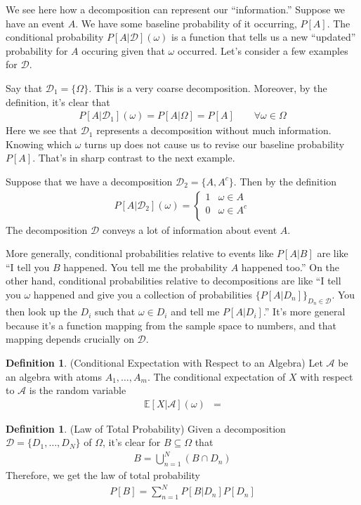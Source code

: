 \documentclass[12pt]{article}
\theoremstyle{plain}
\theoremstyle{definition}
\newtheorem{defn}[thm]{Definition}
\theoremstyle{remark}
\newcommand{\sD}{\mathscr{D}}
\newcommand{\sA}{\mathscr{A}}
\newcommand{\E}{\mathbb{E}}
\newcommand{\sumnN}{\sum^N_{n=1}}
\newcommand{\nN}{_{n=1}^N}
\begin{document}
We see here how a decomposition can represent our ``information.''
Suppose we have an event $A$. We have some baseline probability of it
occurring, $P[A]$. The conditional probability $P[A|\sD](\omega)$ is a
function that tells us a new ``updated'' probability for $A$ occuring
given that $\omega$ occurred. Let's consider a few examples for $\sD$.

Say that $\sD_1=\{\Omega\}$. This is a very coarse decomposition.
Moreover, by the definition, it's clear that
\begin{align*}
  P[A|\sD_1](\omega)=P[A|\Omega]=P[A]
  \qquad\forall\omega\in\Omega
\end{align*}
Here we see that $\sD_1$ represents a decomposition without much
information.  Knowing which $\omega$ turns up does not cause us to
revise our baseline probability $P[A]$. That's in sharp contrast to the
next example.

Suppose that we have a decomposition $\sD_2=\{A,A^c\}$. Then by the
definition
\begin{align*}
  P[A|\sD_2](\omega)
  =
  \begin{cases}
    1 & \omega \in A \\
    0 & \omega \in A^c \\
  \end{cases}
\end{align*}
The decomposition $\sD$ conveys a lot of information about event $A$.

More generally, conditional probabilities relative to events like
$P[A|B]$ are like ``I tell you $B$ happened. You tell me
the probability $A$ happened too.'' On the other hand, conditional
probabilities relative to decompositions are like ``I tell you $\omega$
happened and give you a collection of probabilities
$\{P[A|D_n]\}_{D_n\in\sD}$. You then look up the $D_i$ such that
$\omega\in D_i$ and tell me $P[A|D_i]$.'' It's more general because it's
a function mapping from the sample space to numbers, and that mapping
depends crucially on $\sD$.

\begin{defn}(Conditional Expectation with Respect to an Algebra)
Let $\sA$ be an algebra with atoms $A_1,\ldots,A_m$. The conditional
expectation of $X$ with respect to $\sA$ is the random variable
\begin{align*}
  \E[X|\sA](\omega)
  &=
\end{align*}
\end{defn}

\begin{defn}(Law of Total Probability)
Given a decomposition $\sD=\{D_1,\ldots,D_N\}$ of $\Omega$,
it's clear for $B\subseteq\Omega$ that
\begin{align*}
  B = \bigcup\nN (B\cap D_n)
\end{align*}
Therefore, we get the law of total probability
\begin{align*}
  P[B] = \sumnN P[B|D_n]P[D_n]
\end{align*}
\end{defn}
\end{document}
